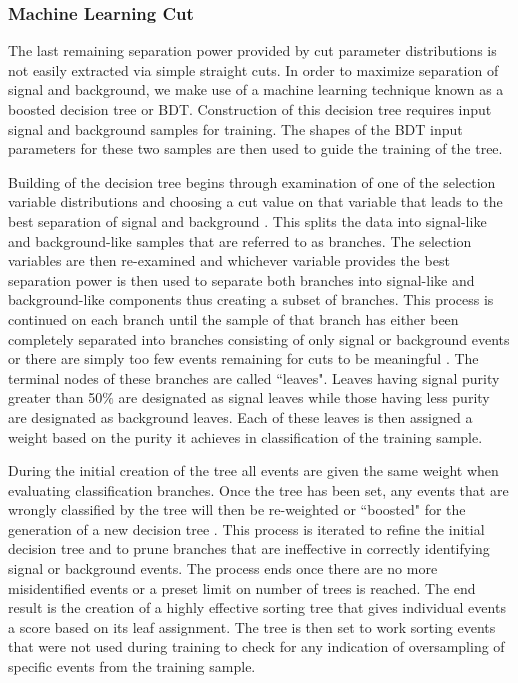\documentclass{gatech-thesis}
\begin{document}
\subsubsection{Machine Learning Cut}
The last remaining separation power provided by cut parameter distributions is not easily extracted via simple straight cuts. In order to maximize separation of signal and background, we make use of a machine learning technique known as a boosted decision tree or BDT. Construction of this decision tree requires input signal and background samples for training. The shapes of the BDT input parameters for these two samples are then used to guide the training of the tree.

Building of the decision tree begins through examination of one of the selection variable distributions and choosing a cut value on that variable that leads to the best separation of signal and background \cite{MachineLearning}. This splits the data into signal-like and background-like samples that are referred to as branches. The selection variables are then re-examined and whichever variable provides the best separation power is then used to separate both branches into signal-like and background-like components thus creating a subset of branches. This process is continued on each branch until the sample of that branch has either been completely separated into branches consisting of only signal or background events or there are simply too few events remaining for cuts to be meaningful \cite{MachineLearning}. The terminal nodes of these branches are called ``leaves". Leaves having signal purity greater than 50$\%$ are designated as signal leaves while those having less purity are designated as background leaves. Each of these leaves is then assigned a weight based on the purity it achieves in classification of the training sample.

During the initial creation of the tree all events are given the same weight when evaluating classification branches. Once the tree has been set, any events that are wrongly classified by the tree will then be re-weighted or ``boosted" for the generation of a new decision tree \cite{MachineLearning}. This process is iterated to refine the initial decision tree and to prune branches that are ineffective in correctly identifying signal or background events. The process ends once there are no more misidentified events or a preset limit on number of trees is reached. The end result is the creation of a highly effective sorting tree that gives individual events a score based on its leaf assignment. The tree is then set to work sorting events that were not used during training to check for any indication of oversampling of specific events from the training sample. 
\end{document}
